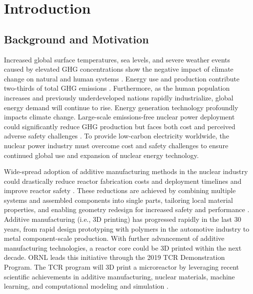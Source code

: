 \chapter{Introduction}
\glsresetall
\label{sec:intro}

\section{Background and Motivation}
Increased global surface temperatures, sea levels, and severe weather events 
caused by elevated \gls{GHG} concentrations show the negative impact of 
climate change on natural and human systems \cite{noauthor_climate_2018}. 
Energy use and production contribute two-thirds of total \gls{GHG}
emissions \cite{noauthor_climate_2018}.
Furthermore, as the human population increases and previously underdeveloped 
nations rapidly industrialize, global energy demand will continue to rise.   
Energy generation technology profoundly impacts climate change. 
Large-scale emissions-free nuclear power deployment could significantly reduce 
\gls{GHG} production but faces both cost and perceived adverse safety challenges 
\cite{noauthor_climate_2018, petti_future_2018}. 
To provide low-carbon electricity worldwide, the nuclear power industry must 
overcome cost and safety challenges to ensure continued global use and 
expansion of nuclear energy technology.

Wide-spread adoption of additive manufacturing methods in the nuclear industry 
could drastically reduce reactor fabrication costs and deployment timelines 
and improve reactor safety \cite{simpson_considerations_2019}. 
These reductions are achieved by combining multiple systems and assembled 
components into single parts, tailoring local material properties, and 
enabling geometry redesign for increased safety and performance 
\cite{simpson_considerations_2019}. 
Additive manufacturing (i.e., 3D printing) has progressed rapidly in the last 
30 years, from rapid design prototyping with polymers in the automotive industry 
to metal component-scale production. With further advancement of additive 
manufacturing technologies, a reactor core could be 3D printed within the next decade. 
\gls{ORNL} leads this initiative through the 2019 \gls{TCR} Demonstration Program. 
The \gls{TCR} program will 3D print a microreactor by leveraging recent scientific 
achievements in additive manufacturing, nuclear materials, machine learning, and 
computational modeling and simulation \cite{terrani_transformational_2019}.

